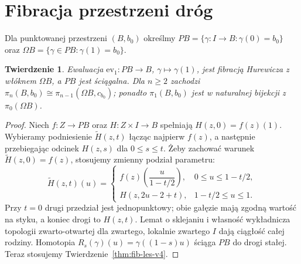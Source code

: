 \documentclass[11pt,a4paper,oneside]{report}
\theoremstyle{plain}
\newtheorem{twierdzenie}{Twierdzenie}[section]
\theoremstyle{definition}
\theoremstyle{remark}
\begin{document}
\section{Fibracja przestrzeni dróg}
Dla punktowanej przestrzeni $(B,b_0)$ określmy
$PB=\{\gamma:I\to B:\gamma(0)=b_0\}$ oraz
$\Omega B=\{\gamma\in PB:\gamma(1)=b_0\}$.
\begin{twierdzenie}
Ewaluacja $\mathrm{ev}_1:PB\to B$, $\gamma\mapsto\gamma(1)$,
jest fibracją Hurewicza z włóknem $\Omega B$, a $PB$ jest
ściągalna. Dla $n\ge2$ zachodzi
$\pi_n(B,b_0)\cong\pi_{n-1}(\Omega B,c_{b_0})$;
ponadto $\pi_1(B,b_0)$ jest w naturalnej bijekcji z
$\pi_0(\Omega B)$.
\end{twierdzenie}
\begin{proof}
Niech $f:Z\to PB$ oraz $H:Z\times I\to B$ spełniają
$H(z,0)=f(z)(1)$. Wybieramy podniesienie $\widetilde H(z,t)$
łącząc najpierw $f(z)$, a następnie przebiegając odcinek
$H(z,s)$ dla $0\le s\le t$. Żeby zachować warunek
$\widetilde H(z,0)=f(z)$, stosujemy zmienny podział parametru:
\[
\widetilde H(z,t)(u)=
\begin{cases}
f(z)\!\left(\dfrac{u}{1-t/2}\right),&0\le u\le1-t/2,\\[4pt]
H\!\left(z,2u-2+t\right),&1-t/2\le u\le1.
\end{cases}
\]
Przy $t=0$ drugi przedział jest jednopunktowy; obie gałęzie
mają zgodną wartość na styku, a koniec drogi to $H(z,t)$.
Lemat o sklejaniu i własność wykładnicza topologii
zwarto-otwartej dla zwartego, lokalnie zwartego $I$ dają
ciągłość całej rodziny. Homotopia
$R_s(\gamma)(u)=\gamma((1-s)u)$ ściąga $PB$ do drogi stałej.
Teraz stosujemy Twierdzenie~\ref{thm:fib-les-v4}.
\end{proof}
\end{document}
